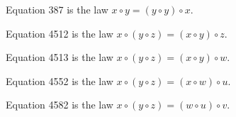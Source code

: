 \begin{definition}[Equation 387]\label{eq387}  Equation 387 is the law $x \circ y = (y \circ y) \circ x$.
\end{definition}

\begin{definition}[Equation 4512]\label{eq4512}  Equation 4512 is the law $x \circ (y \circ z) = (x \circ y) \circ z$.
\end{definition}

\begin{definition}[Equation 4513]\label{eq4513}  Equation 4513 is the law $x \circ (y \circ z) = (x \circ y) \circ w$.
\end{definition}

\begin{definition}[Equation 4552]\label{eq4552}  Equation 4552 is the law $x \circ (y \circ z) = (x \circ w) \circ u$.
\end{definition}

\begin{definition}[Equation 4582]\label{eq4582}  Equation 4582 is the law $x \circ (y \circ z) = (w \circ u) \circ v$.
\end{definition}
